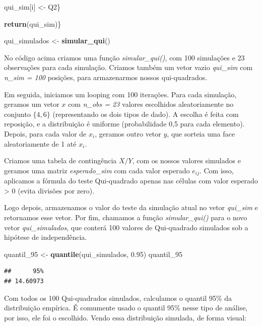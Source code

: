 \documentclass[
]{book}
\newenvironment{Shaded}{\begin{snugshade}}{\end{snugshade}}
\newcommand{\FloatTok}[1]{\textcolor[rgb]{0.00,0.00,0.81}{#1}}
\newcommand{\FunctionTok}[1]{\textcolor[rgb]{0.13,0.29,0.53}{\textbf{#1}}}
\newcommand{\NormalTok}[1]{#1}
\newcommand{\OtherTok}[1]{\textcolor[rgb]{0.56,0.35,0.01}{#1}}
\begin{document}
\begin{Shaded}
\begin{Highlighting}[]
\NormalTok{    qui\_sim[i] }\OtherTok{\textless{}{-}}\NormalTok{ Q2\}}
  
  \FunctionTok{return}\NormalTok{(qui\_sim)\}}

\NormalTok{qui\_simulados }\OtherTok{\textless{}{-}} \FunctionTok{simular\_qui}\NormalTok{()}
\end{Highlighting}
\end{Shaded}

No código acima criamos uma função \emph{simular\_qui()}, com 100 simulações e 23 observações para cada simulação. Criamos também um vetor vazio \emph{qui\_sim} com \emph{n\_sim = 100} posições, para armazenarmos nossos qui-quadrados.

Em seguida, iniciamos um looping com 100 iterações. Para cada simulação, geramos um vetor \(x\) com \emph{n\_obs = 23} valores escolhidos aleatoriamente no conjunto \(\{ 4, 6\}\) (representando os dois tipos de dado). A escolha é feita com reposição, e a distribuição é uniforme (probabilidade 0,5 para cada elemento). Depois, para cada valor de \(x_i\), geramos outro vetor \(y\), que sorteia uma face aleatoriamente de 1 até \(x_i\).

Criamos uma tabela de contingência \(X / Y\), com os nossos valores simulados e geramos uma matriz \emph{esperado\_sim} com cada valor esperado \(e_{ij}\). Com isso, aplicamos a fórmula do teste Qui-quadrado apenas nas células com valor esperado \textgreater{} 0 (evita divisões por zero).

Logo depois, armazenamos o valor do teste da simulação atual no vetor \emph{qui\_sim} e retornamos esse vetor. Por fim, chamamos a função \emph{simular\_qui()} para o novo vetor \emph{qui\_simulados}, que conterá 100 valores de Qui-quadrado simulados sob a hipótese de independência.

\begin{Shaded}
\begin{Highlighting}[]
\NormalTok{quantil\_95 }\OtherTok{\textless{}{-}} \FunctionTok{quantile}\NormalTok{(qui\_simulados, }\FloatTok{0.95}\NormalTok{)}
\NormalTok{quantil\_95}
\end{Highlighting}
\end{Shaded}

\begin{verbatim}
##      95% 
## 14.60973
\end{verbatim}

Com todos os 100 Qui-quadrados simulados, calculamos o quantil 95\% da distribuição empírica. É comumente usado o quantil 95\% nesse tipo de análise, por isso, ele foi o escolhido. Vendo essa distribuição simulada, de forma visual:
\end{document}
